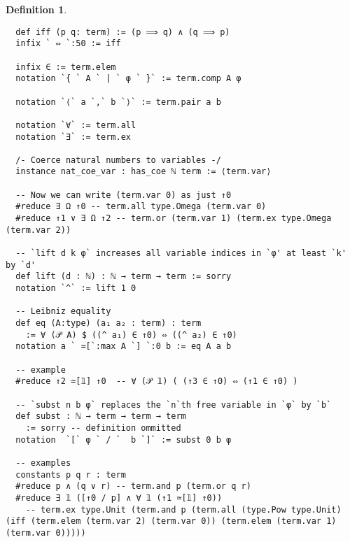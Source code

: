 \documentclass[12pt,leqno]{article}
\theoremstyle{example}
\newtheorem{definition}[theorem]{Definition}
\numberwithin{equation}{section}
\begin{document}
\begin{definition}
\begin{lstlisting}
  def iff (p q: term) := (p ⟹ q) ∧ (q ⟹ p)
  infix ` ⇔ `:50 := iff

  infix ∈ := term.elem
  notation `{ ` A ` | ` φ ` }` := term.comp A φ

  notation `⟨` a `,` b `⟩` := term.pair a b 

  notation `∀` := term.all
  notation `∃` := term.ex

  /- Coerce natural numbers to variables -/
  instance nat_coe_var : has_coe ℕ term := ⟨term.var⟩

  -- Now we can write (term.var 0) as just ↑0
  #reduce ∃ Ω ↑0 -- term.all type.Omega (term.var 0)
  #reduce ↑1 ∨ ∃ Ω ↑2 -- term.or (term.var 1) (term.ex type.Omega (term.var 2))

  -- `lift d k φ` increases all variable indices in `φ' at least `k' by `d'
  def lift (d : ℕ) : ℕ → term → term := sorry
  notation `^` := lift 1 0

  -- Leibniz equality
  def eq (A:type) (a₁ a₂ : term) : term
    := ∀ (𝒫 A) $ ((^ a₁) ∈ ↑0) ⇔ ((^ a₂) ∈ ↑0)
  notation a ` ≃[`:max A `] `:0 b := eq A a b
  
  -- example
  #reduce ↑2 ≃[𝟙] ↑0  -- ∀ (𝒫 𝟙) ( (↑3 ∈ ↑0) ⇔ (↑1 ∈ ↑0) )
  
  -- `subst n b φ` replaces the `n`th free variable in `φ` by `b`
  def subst : ℕ → term → term → term
    := sorry -- definition ommitted
  notation  `[` φ ` / `  b `]` := subst 0 b φ

  -- examples
  constants p q r : term
  #reduce p ∧ (q ∨ r) -- term.and p (term.or q r)
  #reduce ∃ 𝟙 ([↑0 / p] ∧ ∀ 𝟙 (↑1 ≃[𝟙] ↑0))
    -- term.ex type.Unit (term.and p (term.all (type.Pow type.Unit) (iff (term.elem (term.var 2) (term.var 0)) (term.elem (term.var 1) (term.var 0)))))
  \end{lstlisting}

\end{definition}
\end{document}
